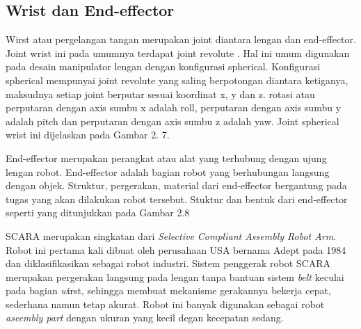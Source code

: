 \subsection{ Wrist dan End-effector }

Wirst atau pergelangan tangan merupakan joint diantara lengan dan end-effector. Joint wrist ini pada umumnya terdapat joint revolute . Hal ini umum digunakan pada desain manipulator lengan dengan konfigurasi spherical. Konfigurasi spherical mempunyai joint revolute yang saling berpotongan diantara ketiganya, maksudnya setiap joint berputar sesuai koordinat x, y dan z. rotasi atau perputaran dengan axis sumbu x adalah roll, perputaran dengan axis sumbu y adalah pitch dan perputaran dengan axis sumbu z adalah yaw. Joint spherical wrist ini dijelaskan pada Gambar 2. 7.


End-effector merupakan perangkat atau alat yang terhubung dengan ujung lengan robot. End-effector adalah bagian robot yang berhubungan langsung dengan objek. Struktur, pergerakan, material dari end-effector bergantung pada tugas yang akan dilakukan robot tersebut. Stuktur dan bentuk dari end-effector seperti yang ditunjukkan pada Gambar 2.8

SCARA merupakan singkatan dari \emph{Selective Compliant Assembly Robot Arm}. Robot ini pertama kali dibuat oleh perusahaan USA bernama Adept pada 1984 dan diklasifikasikan sebagai robot industri. Sistem penggerak robot SCARA merupakan pergerakan langsung pada lengan tanpa bantuan sistem \emph{belt} keculai pada bagian \emph wirst, sehingga membuat mekanisme gerakannya bekerja cepat, sederhana namun tetap akurat. Robot ini banyak digunakan sebagai robot \emph {aseembly part} dengan ukuran yang kecil degan kecepatan sedang. 

